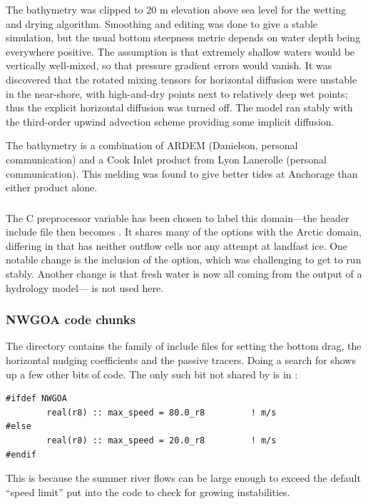 The bathymetry was clipped to 20 m elevation above sea level for the
wetting and drying algorithm. Smoothing and editing was done to
give a stable simulation, but the usual bottom steepness metric
depends on water depth being everywhere positive. The assumption
is that extremely shallow waters would be vertically well-mixed,
so that pressure gradient errors would vanish. It was discovered
that the rotated mixing tensors for horizontal diffusion were
unstable in the near-shore, with high-and-dry points next to
relatively deep wet points; thus the explicit horizontal diffusion
was turned off. The model ran stably with the third-order upwind
advection scheme providing some implicit diffusion.

The bathymetry is a combination of ARDEM (Danielson, personal
communication) and a Cook Inlet product from Lyon Lanerolle
(personal communication). This melding was found to give better
tides at Anchorage than either product alone.

\subsubsection{}
The C preprocessor variable  has been chosen to label
this domain---the header include file then becomes .
It shares many of the options with the Arctic domain, differing in
that has neither outflow cells nor any attempt at landfast ice. One
notable change is the inclusion of the  option, which
was challenging to get to run stably. Another change is that fresh water
is now all coming from the output of a hydrology model---
is not used here.

\subsubsection{NWGOA code chunks}
The  directory contains the  family
of include files for setting the bottom drag, the horizontal nudging
coefficients and the passive tracers. Doing a search for 
shows up a few other bits of code. The only such bit not shared
by  is in :
\begin{verbatim}
#ifdef NWGOA
        real(r8) :: max_speed = 80.0_r8         ! m/s
#else
        real(r8) :: max_speed = 20.0_r8         ! m/s
#endif
\end{verbatim}
This is because the summer river flows can be large enough to
exceed the default ``speed limit'' put into the code to check for growing
instabilities. 

